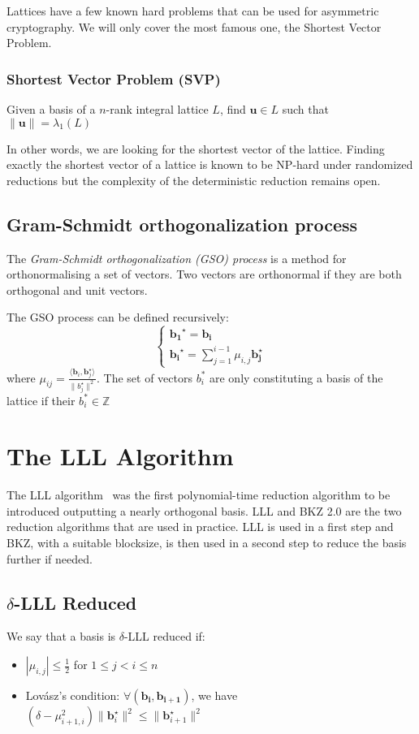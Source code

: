 \documentclass[10pt, a4paper]{article}
\renewcommand{\vec}[1]{\mathbf{#1}}
\begin{document}
Lattices have a few known hard problems that can be used for asymmetric cryptography. We will only cover the most famous one, the Shortest Vector Problem.

\subsubsection{Shortest Vector Problem (SVP)}

Given a basis of a $n$-rank integral lattice $L$, find $\vec{u} \in L$ such that $\|\vec{u}\| = \lambda_1 (L)$

In other words, we are looking for the shortest vector of the lattice. Finding exactly the shortest vector of a lattice is known to be NP-hard under randomized reductions\cite{Ajtai:1998:SVP} but the complexity of the deterministic reduction remains open.

\subsection{Gram-Schmidt orthogonalization process}
The \emph{Gram-Schmidt orthogonalization (\emph GSO) process} is a method for orthonormalising a set of vectors. Two vectors are orthonormal if they are both orthogonal and unit vectors. 

The GSO process  can be defined recursively:
\[
\begin{cases}
\vec{b_1}^{\star} = \vec{b_i}  \\
\vec{b_i}^{\star} = \displaystyle\sum^{i-1}_{j=1} \mu_{i,j} \vec{b_j^\star}
\end{cases}
\]
where $\mu_{ij} = \frac{\langle \vec{b}_i, \vec{b}_j^\star \rangle}{\| b_j^\star\|^2}$. The set of vectors $b_i^*$ are only constituting a basis of the lattice if their $b_i^* \in \mathbb{Z}$

\section{The LLL Algorithm}

The LLL algorithm~\cite{lllpaper} was the first polynomial-time reduction algorithm to be introduced outputting a nearly orthogonal basis. LLL and BKZ 2.0 are the two reduction algorithms that are used in practice. LLL is used in a first step and BKZ, with a suitable blocksize, is then used in a second step to reduce the basis further if needed.

\subsection{$\delta$-LLL Reduced}
We say that a basis is $\delta$-LLL reduced if:
\begin{itemize}
\item $| \mu_{i,j}| \leq \frac{1}{2} $ for $1 \leq j < i \leq n$
\item Lovász's condition: $\forall (\vec{b_i, b_{i+1}})$, we have $(\delta - \mu^2_{i+1,i}) \|\vec{b}^{\star}_{i}\|^2 \leq \| \vec{b}^{\star}_{i+1} \|^2$
\end{itemize}
\end{document}
